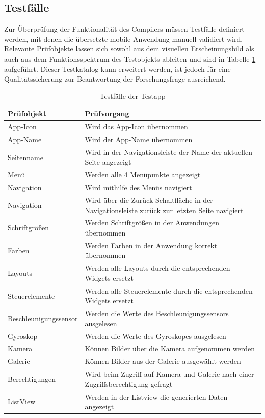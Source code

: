 \subsection{Testfälle}
Zur Überprüfung der Funktionalität des Compilers müssen Testfälle definiert werden,  mit denen die übersetzte mobile Anwendung manuell validiert wird.  Relevante Prüfobjekte lassen sich sowohl aus dem visuellen  Erscheinungsbild als auch aus dem Funktionsspektrum des Testobjekts ableiten und sind in Tabelle \ref{tab:Testapp} aufgeführt.  Dieser Testkatalog kann erweitert werden,  ist jedoch für eine Qualitätssicherung zur Beantwortung der Forschungsfrage ausreichend.  
\newpage

\begin{table}[!ht]
\begin{tabularx}{\textwidth}{|l|X|}
\hline
 \textbf{Prüfobjekt} & \textbf{Prüfvorgang}  \\  
\hline
App-Icon	           					& Wird das App-Icon übernommen                       			 		\\ 
App-Name          					& Wird der App-Name übernommen                      		 \\ 
Seitenname  	         				& Wird in der Navigationsleiste der Name der aktuellen Seite angezeigt               \\ 
Menü         			  				& Werden alle 4 Menüpunkte angezeigt                     			 \\ 
Navigation         			  		& Wird mithilfe des Menüs navigiert	\\ 
Navigation          					& Wird über die Zurück-Schaltfläche in der Navigationsleiste zurück zur letzten Seite navigiert                   			 \\ 
Schriftgrößen			         	& Werden  Schriftgrößen in der Anwendungen übernommen                 			 \\ 
Farben						         	& Werden  Farben in der Anwendung korrekt übernommen                 			 \\ 
Layouts 								& Werden alle Layouts durch die entsprechenden Widgets ersetzt              			 \\ 
Steuerelemente						& Werden alle Steuerelemente durch die entsprechenden Widgets ersetzt               			 \\ 
Beschleunigungssensor        	& Werden die Werte des Beschleunigungssensors ausgelesen          			 \\ 
Gy­ro­s­kop						         & Werden die Werte des Gyroskopes ausgelesen                            			 \\ 
Kamera			         				& Können Bilder über die Kamera aufgenommen werden\\ 
Galerie			         				& Können Bilder aus der Galerie ausgewählt werden                			 \\ 
Berechtigungen			         	& Wird beim Zugriff auf Kamera und Galerie nach einer Zugriffsberechtigung gefragt \\ 
ListView					         	& Werden in der Listview die generierten Daten angezeigt                   			 \\ 
\hline
\end{tabularx}
	  \caption{Testfälle der Testapp}
 \label{tab:Testapp}
\end{table}

